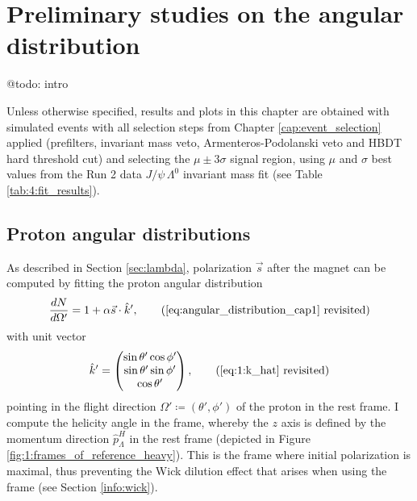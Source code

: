 \chapter{Preliminary studies on the \texorpdfstring{\lambdadecay}{Lambda baryon decay} angular distribution}
\label{cap:angular_distribution}

@todo: intro

Unless otherwise specified, results and plots in this chapter are obtained with simulated \demonstratorshort events with all selection steps from Chapter \ref{cap:event_selection} applied (prefilters, \bz invariant mass veto, \kshort Armenteros-Podolanski veto and HBDT hard threshold cut) and selecting the $\mu \pm 3\sigma$ signal region, using $\mu$ and $\sigma$ best values from the Run 2 data $J/\psi\,\Lambda^0$ invariant mass fit (see Table \ref{tab:4:fit_results}).

\section{Proton angular distributions}
As described in Section \ref{sec:lambda}, \lz polarization $\vec{s}$ after the magnet can be computed by fitting the proton angular distribution
\begin{equation*}
	\frac{dN}{d\Omega'} = 1+ \alpha \vec{s} \cdot \hat{k}',
	\tag{\ref{eq:angular_distribution_cap1} revisited}
\end{equation*}
with unit vector
\begin{equation*}
\hat{k}'
=
\begin{pmatrix}
	\sin \theta' \cos \phi' \\
	\sin \theta' \sin \phi' \\
	\cos \theta'
\end{pmatrix},
\tag{\ref{eq:1:k_hat} revisited}
\end{equation*}
pointing in the flight direction $\Omega' \coloneqq (\theta',\phi')$ of the proton in the \lz rest frame.
I compute the helicity angle in the \slambda frame, whereby the $z$ axis is defined by the \lz momentum direction $\hat{p}_\Lambda^H$ in the \lbz rest frame \shad (depicted in Figure \ref{fig:1:frames_of_reference_heavy}).
This is the frame where initial \lz polarization is maximal, thus preventing the Wick dilution effect that arises when using the \slambdal frame (see Section \ref{info:wick}).

